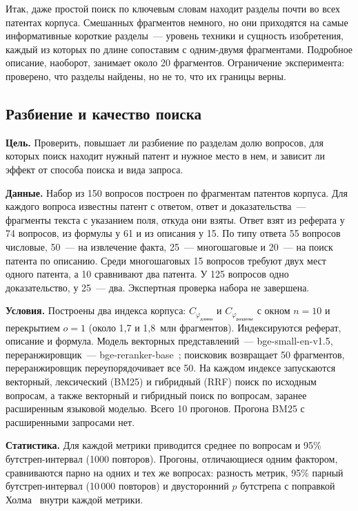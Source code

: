 \documentclass{article}
\begin{document}
Итак, даже простой поиск по ключевым словам находит разделы почти во всех патентах корпуса. Смешанных фрагментов немного, но они приходятся на самые информативные короткие разделы~--- уровень техники и сущность изобретения, каждый из которых по длине сопоставим с одним-двумя фрагментами. Подробное описание, наоборот, занимает около 20 фрагментов. Ограничение эксперимента: проверено, что разделы найдены, но не то, что их границы верны.

\subsection{Разбиение и качество поиска}\label{sec:exp-retrieval}

\textbf{Цель.} Проверить, повышает ли разбиение по разделам долю вопросов, для которых поиск находит нужный патент и нужное место в нем, и зависит ли эффект от способа поиска и вида запроса.

\textbf{Данные.} Набор из 150 вопросов построен по фрагментам патентов корпуса. Для каждого вопроса известны патент с ответом, ответ и доказательства~--- фрагменты текста с указанием поля, откуда они взяты. Ответ взят из реферата у 74 вопросов, из формулы у 61 и из описания у 15. По типу ответа 55 вопросов числовые, 50~--- на извлечение факта, 25~--- многошаговые и 20~--- на поиск патента по описанию. Среди многошаговых 15 вопросов требуют двух мест одного патента, а 10 сравнивают два патента. У 125 вопросов одно доказательство, у 25~--- два. Экспертная проверка набора не завершена.

\textbf{Условия.} Построены два индекса корпуса: $C_{\varphi_{\text{длина}}}$ и $C_{\varphi_{\text{разделы}}}$ с окном $n = 10$ и перекрытием $o = 1$ (около 1,7 и 1,8~млн фрагментов). Индексируются реферат, описание и формула. Модель векторных представлений~--- bge-small-en-v1.5, переранжировщик~--- bge-reranker-base~\citep{xiao2023cpack}; поисковик возвращает 50 фрагментов, переранжировщик переупорядочивает все 50. На каждом индексе запускаются векторный, лексический (BM25) и гибридный (RRF) поиск по исходным вопросам, а также векторный и гибридный поиск по вопросам, заранее расширенным языковой моделью. Всего 10 прогонов. Прогона BM25 с расширенными запросами нет.

\textbf{Статистика.} Для каждой метрики приводится среднее по вопросам и 95\% бутстреп-интервал (1000 повторов). Прогоны, отличающиеся одним фактором, сравниваются парно на одних и тех же вопросах: разность метрик, 95\% парный бутстреп-интервал (10\,000 повторов) и двусторонний $p$ бутстрепа с поправкой Холма~\citep{holm1979} внутри каждой метрики.
\end{document}
